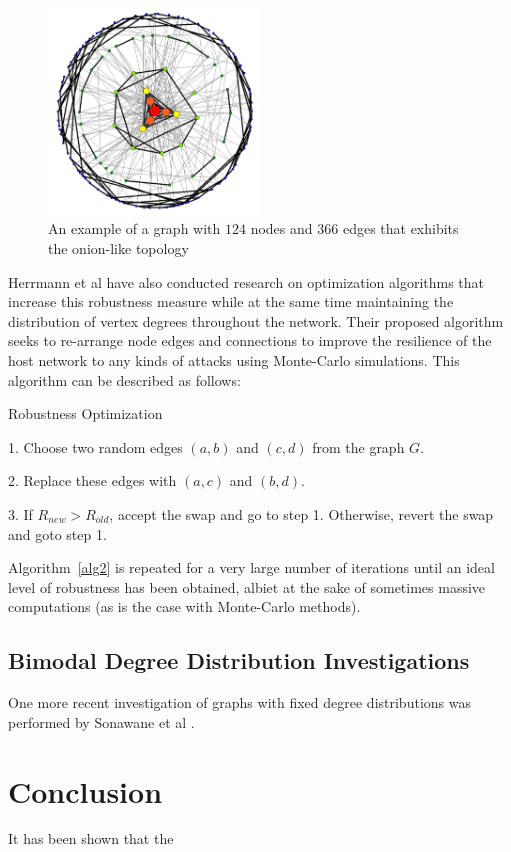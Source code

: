 \documentclass[doc]{apa}%
\begin{document}
\begin{figure}[h!]
	\label{fig:Onion}
	\centering
		\includegraphics[width=0.5\textwidth]{Onion.jpg}
	\caption{An example of a graph with $124$ nodes and $366$ edges that exhibits the onion-like topology } %
\end{figure}

Herrmann et al have also conducted research on optimization algorithms that increase this robustness measure while at the same time maintaining the distribution of vertex degrees throughout the network. Their proposed algorithm seeks to re-arrange node edges and connections to improve the resilience of the host network to any kinds of attacks using Monte-Carlo simulations. This algorithm can be described as follows:

\begin{algorithm}
\caption{Robustness Optimization}
\label{alg2}
\begin{algorithmic}
	\item 1. Choose two random edges $(a,b)$ and $(c,d)$ from the graph $G$.
	\item 2. Replace these edges with $(a,c)$ and $(b,d)$.
	\item 3. If $R_{new} > R_{old}$, accept the swap and go to step 1. Otherwise, revert the swap and goto step 1. 
\end{algorithmic}
\end{algorithm}

Algorithm~\ref{alg2} is repeated for a very large number of iterations until an ideal level of robustness has been obtained, albiet at the sake of sometimes massive computations (as is the case with Monte-Carlo methods).


\subsection{Bimodal Degree Distribution Investigations}
One more recent investigation of graphs with fixed degree distributions was performed by Sonawane et al \cite{bimodal}. 

\section{Conclusion}
It has been shown that the 


\end{document}

